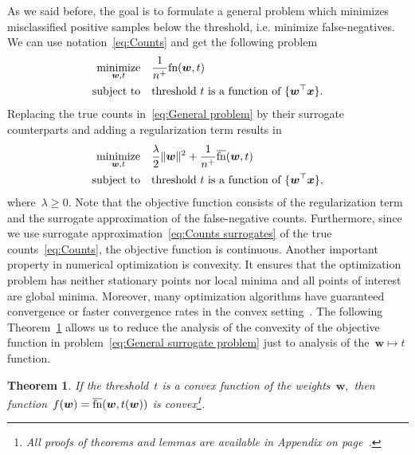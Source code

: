 \documentclass[11pt,a4paper]{article}
\newtheorem{theorem}[thm]{Theorem}
\theoremstyle{definition}
\newcommand{\norm}[1]{\|#1\|}
\newcommand{\minimize}{\operatorname*{minimize}}
\newcommand{\st}{\operatorname{subject\ to}}
\newcommand{\fn}{\textnormal{fn}}
\newcommand{\fns}{\overline{\textnormal{fn}}}
\begin{document}
As we said before, the goal is to formulate a general problem which minimizes misclassified positive samples below the threshold, i.e. minimize false-negatives. We can use notation~\eqref{eq:Counts} and get the following problem
\begin{equation}\label{eq:General problem}
  \begin{aligned}
    \minimize_{\bm{w}, t} & \quad \frac{1}{n^+} \fn(\bm{w},t) \\
    \st                   & \quad \text{threshold } t \text{ is a function of } \{\bm{w}^\top \bm{x} \}.
  \end{aligned}
\end{equation}
Replacing the true counts in~\eqref{eq:General problem} by their surrogate counterparts and adding a regularization term results in
\begin{equation}\label{eq:General surrogate problem}
  \begin{aligned}
    \minimize_{\bm{w}, t} & \quad \frac{\lambda}{2}\norm{\bm{w}}^2 + \frac{1}{n^+}\fns(\bm{w},t) \\
    \st                   & \quad \text{threshold }t \text{ is a function of }\{\bm{w}^\top \bm{x}\},
  \end{aligned}
\end{equation}
where~$\lambda \geq 0.$ Note that the objective function consists of the regularization term and the surrogate approximation of the false-negative counts. Furthermore, since we use surrogate approximation~\eqref{eq:Counts surrogates} of the true counts~\eqref{eq:Counts}, the objective function is continuous. Another important property in numerical optimization is convexity. It ensures that the optimization problem has neither stationary points nor local minima and all points of interest are global minima. Moreover, many optimization algorithms have guaranteed convergence or faster convergence rates in the convex setting~\cite{boyd2004convex}. The following Theorem~\ref{thm:convex} allows us to reduce the analysis of the convexity of the objective function in problem~\eqref{eq:General surrogate problem} just to analysis of the~$\bm{w} \mapsto t$ function.
\begin{theorem}\label{thm:convex}
  If the threshold~$t$ is a convex function of the weights~$\bm{w},$ then function~$f(\bm{w}) = \fns(\bm{w}, t(\bm{w}))$ is convex\footnote{All proofs of theorems and lemmas are available in Appendix  on page~\pageref{app:Additional results and proofs}.}.
\end{theorem}
\end{document}
